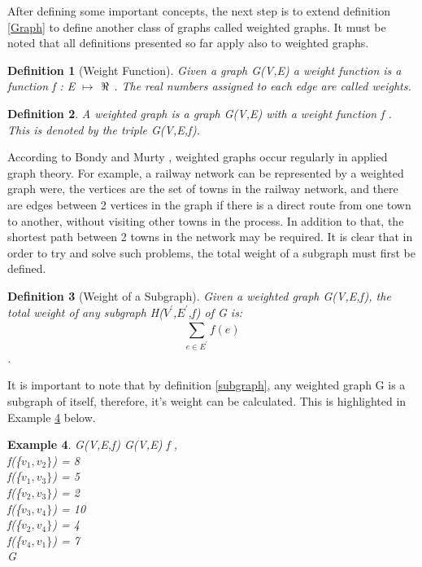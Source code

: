\documentclass{article}
\newtheorem{definition}{Definition}[subsection]
\newtheorem{example}[definition]{Example}
\begin{document}
After defining some important concepts, the next step is to extend definition \ref{Graph} to define another class of graphs called weighted graphs. It must be noted that all definitions presented so far apply also to weighted graphs.
\begin{definition}[Weight Function]
\label{Weighted Function}
Given a graph G(V,E) a weight function is a function f : E $\mapsto$ $\real$ {}. The real numbers assigned to each edge are called weights.
\end{definition}
\begin{definition}
\label{Weighted Graph}
A weighted graph is a graph G(V,E) with a weight function f {}. This is denoted by the triple G(V,E,f). 
\end{definition}
According to Bondy and Murty \cite{bondy_murty_1982}, weighted graphs occur regularly in applied graph theory. For example, a railway network can be represented by a weighted graph were, the vertices are the set of towns in the railway network, and there are edges between 2 vertices in the graph if there is a direct route from one town to another, without visiting other towns in the process. In addition to that, the shortest path between 2 towns in the network may be required. It is clear that in order to try and solve such problems, the total weight of a subgraph must first be defined.
\begin{definition}[Weight of a Subgraph]
\label{weightofasubgraph}
Given a weighted graph G(V,E,f), the total weight of any subgraph  H($V^\prime$,$E^\prime$,f) of G is: $$\sum_{e \in E^\prime}^{} f(e) $$. 
\end{definition}
It is important to note that by definition \ref{subgraph}, any weighted graph G is a subgraph of itself, therefore, it's weight can be calculated. This is highlighted in Example \ref{example4} below.
\begin{example}
\label{example4}
{} G(V,E,f) {} G(V,E) {} f {},\\
f(\{$v_1, v_2\}$) = 8\\
f(\{$v_1, v_3\}$) = 5\\
f(\{$v_2, v_3\}$) = 2\\
f(\{$v_3, v_4\}$) = 10\\
f(\{$v_2, v_4\}$) = 4\\
f(\{$v_4, v_1\}$) = 7\\
{} G {}\\
\end{example}
\end{document}
